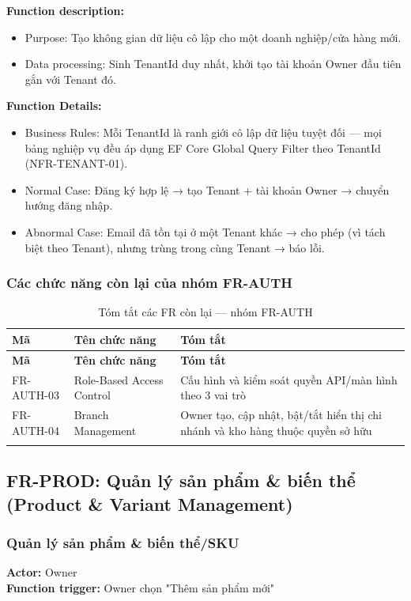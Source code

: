 \textbf{Function description:}
\begin{itemize}
    \item Purpose: Tạo không gian dữ liệu cô lập cho một doanh nghiệp/cửa hàng mới.
    \item Data processing: Sinh TenantId duy nhất, khởi tạo tài khoản Owner đầu tiên gắn với Tenant đó.
\end{itemize}

\textbf{Function Details:}
\begin{itemize}
    \item Business Rules: Mỗi TenantId là ranh giới cô lập dữ liệu tuyệt đối — mọi bảng nghiệp vụ đều áp dụng EF Core Global Query Filter theo TenantId (NFR-TENANT-01).
    \item Normal Case: Đăng ký hợp lệ → tạo Tenant + tài khoản Owner → chuyển hướng đăng nhập.
    \item Abnormal Case: Email đã tồn tại ở một Tenant khác → cho phép (vì tách biệt theo Tenant), nhưng trùng trong cùng Tenant → báo lỗi.
\end{itemize}

\subsubsection{Các chức năng còn lại của nhóm FR-AUTH}

\begin{longtable}{|p{2cm}|p{4.5cm}|p{7cm}|}
    \hline
    \textbf{Mã} & \textbf{Tên chức năng} & \textbf{Tóm tắt} \\
    \hline
    \endfirsthead
    \hline
    \textbf{Mã} & \textbf{Tên chức năng} & \textbf{Tóm tắt} \\
    \hline
    \endhead
    FR-AUTH-03 & Role-Based Access Control & Cấu hình và kiểm soát quyền API/màn hình theo 3 vai trò \\
    \hline
    FR-AUTH-04 & Branch Management & Owner tạo, cập nhật, bật/tắt hiển thị chi nhánh và kho hàng thuộc quyền sở hữu \\
    \hline
    \caption{Tóm tắt các FR còn lại — nhóm FR-AUTH}
\end{longtable}

\subsection{FR-PROD: Quản lý sản phẩm \& biến thể (Product \& Variant Management)}

\subsubsection{Quản lý sản phẩm \& biến thể/SKU}
\textbf{Actor:} Owner \\
\textbf{Function trigger:} Owner chọn "Thêm sản phẩm mới"

